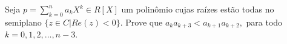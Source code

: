 Seja \( p=\sum\limits_{k=0}^n a_kX^k\in R[X] \) um polinômio cujas raízes estão todas no semiplano \( \{z\in C| Re(z)<0 \}. \) Prove que \( a_ka_{k+3}<a_{k+1}a_{k+2}, \) para todo \( k=0,1,2,\dots,n-3. \)
